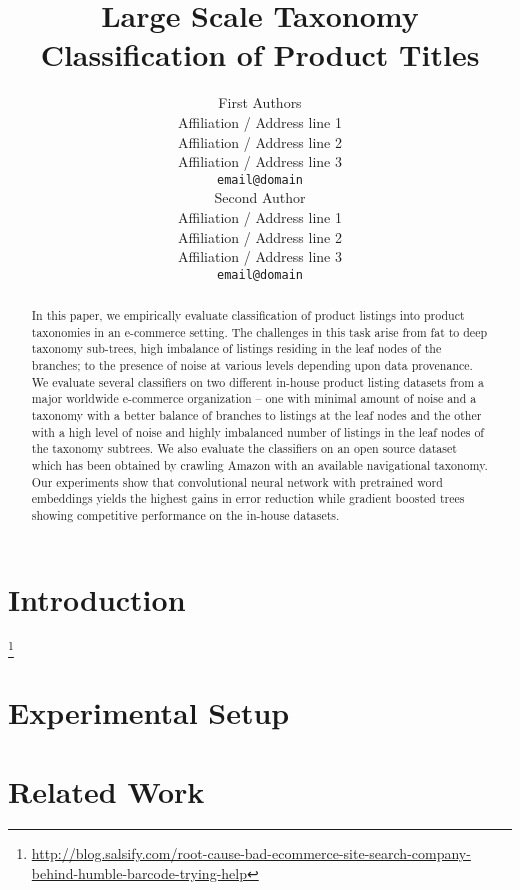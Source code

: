 \documentclass[11pt]{article}
\title{Large Scale Taxonomy Classification of Product Titles}
\author{First Authors \\
  Affiliation / Address line 1 \\
  Affiliation / Address line 2 \\
  Affiliation / Address line 3 \\
  {\tt email@domain} \\\And
  Second Author \\
  Affiliation / Address line 1 \\
  Affiliation / Address line 2 \\
  Affiliation / Address line 3 \\
  {\tt email@domain} \\}
\date{}
\begin{document}
\maketitle
\begin{abstract}
In this paper, we empirically evaluate classification of product listings into product taxonomies in an e-commerce setting.
The challenges in this task arise from fat to deep taxonomy sub-trees, high imbalance of listings residing in the leaf nodes of the branches; to the presence of noise at various levels depending upon data provenance.
We evaluate several classifiers on two different in-house product listing datasets from a major worldwide e-commerce organization -- 
one with minimal amount of noise and a taxonomy with a better balance of branches to listings at the leaf nodes and the other with a high level of noise and highly imbalanced number of listings in the leaf nodes of the taxonomy subtrees. 
We also evaluate the classifiers on an open source dataset which has been obtained by crawling Amazon with an available navigational taxonomy. 
Our experiments show that convolutional neural network with pretrained word embeddings yields the highest gains in error reduction while gradient boosted trees showing competitive performance on the in-house datasets.

\end{abstract}

\section{Introduction}
\label{Sect:intro}



\footnote{\url{http://blog.salsify.com/root-cause-bad-ecommerce-site-search-company-behind-humble-barcode-trying-help}}

\section{Experimental Setup}
\label{Sect:experimental_setup}



\section{Related Work}
\label{Sect:related}
\end{document}
